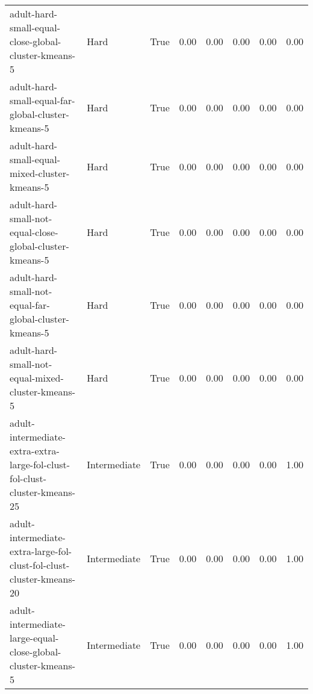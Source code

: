 \begin{longtable}{llllllll}
                                                         adult-hard-small-equal-close-global-cluster-kmeans-5 &         Hard &        True &                 0.00 &                 0.00 &                         0.00 &                         0.00 &                         0.00 \\
                                                           adult-hard-small-equal-far-global-cluster-kmeans-5 &         Hard &        True &                 0.00 &                 0.00 &                         0.00 &                         0.00 &                         0.00 \\
                                                                adult-hard-small-equal-mixed-cluster-kmeans-5 &         Hard &        True &                 0.00 &                 0.00 &                         0.00 &                         0.00 &                         0.00 \\
                                                     adult-hard-small-not-equal-close-global-cluster-kmeans-5 &         Hard &        True &                 0.00 &                 0.00 &                         0.00 &                         0.00 &                         0.00 \\
                                                       adult-hard-small-not-equal-far-global-cluster-kmeans-5 &         Hard &        True &                 0.00 &                 0.00 &                         0.00 &                         0.00 &                         0.00 \\
                                                            adult-hard-small-not-equal-mixed-cluster-kmeans-5 &         Hard &        True &                 0.00 &                 0.00 &                         0.00 &                         0.00 &                         0.00 \\
                                   adult-intermediate-extra-extra-large-fol-clust-fol-clust-cluster-kmeans-25 & Intermediate &        True &                 0.00 &                 0.00 &                         0.00 &                         0.00 &                         1.00 \\
                                         adult-intermediate-extra-large-fol-clust-fol-clust-cluster-kmeans-20 & Intermediate &        True &                 0.00 &                 0.00 &                         0.00 &                         0.00 &                         1.00 \\
                                                 adult-intermediate-large-equal-close-global-cluster-kmeans-5 & Intermediate &        True &                 0.00 &                 0.00 &                         0.00 &                         0.00 &                         1.00 \\

\end{longtable}
